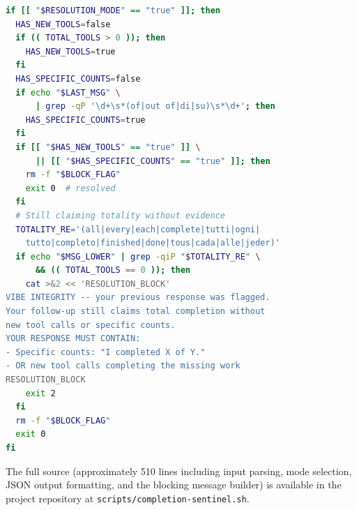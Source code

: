 \begin{lstlisting}[language=bash,caption={Resolution mode handler.}]
if [[ "$RESOLUTION_MODE" == "true" ]]; then
  HAS_NEW_TOOLS=false
  if (( TOTAL_TOOLS > 0 )); then
    HAS_NEW_TOOLS=true
  fi
  HAS_SPECIFIC_COUNTS=false
  if echo "$LAST_MSG" \
      | grep -qP '\d+\s*(of|out of|di|su)\s*\d+'; then
    HAS_SPECIFIC_COUNTS=true
  fi
  if [[ "$HAS_NEW_TOOLS" == "true" ]] \
      || [[ "$HAS_SPECIFIC_COUNTS" == "true" ]]; then
    rm -f "$BLOCK_FLAG"
    exit 0  # resolved
  fi
  # Still claiming totality without evidence
  TOTALITY_RE='(all|every|each|complete|tutti|ogni|
    tutto|completo|finished|done|tous|cada|alle|jeder)'
  if echo "$MSG_LOWER" | grep -qiP "$TOTALITY_RE" \
      && (( TOTAL_TOOLS == 0 )); then
    cat >&2 << 'RESOLUTION_BLOCK'
VIBE INTEGRITY -- your previous response was flagged.
Your follow-up still claims total completion without
new tool calls or specific counts.
YOUR RESPONSE MUST CONTAIN:
- Specific counts: "I completed X of Y."
- OR new tool calls completing the missing work
RESOLUTION_BLOCK
    exit 2
  fi
  rm -f "$BLOCK_FLAG"
  exit 0
fi
\end{lstlisting}

The full source (approximately 510 lines including input parsing, mode
selection, JSON output formatting, and the blocking message builder) is
available in the project repository at
\texttt{scripts/completion-sentinel.sh}.
